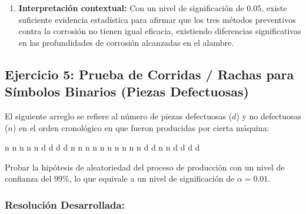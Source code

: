 \documentclass[11pt,a4paper]{article}
\begin{document}
\begin{enumerate}
    \item \textbf{Interpretación contextual:}
    Con un nivel de significación de $0.05$, existe suficiente evidencia estadística para afirmar que los tres métodos preventivos contra la corrosión no tienen igual eficacia, existiendo diferencias significativas en las profundidades de corrosión alcanzadas en el alambre.

\end{enumerate}

\newpage
\subsection{Ejercicio 5: Prueba de Corridas / Rachas para Símbolos Binarios (Piezas Defectuosas)} \label{ej:racha_bin}

\begin{tcolorbox}[colback=white,colframe=blue!60!black,title=Enunciado]
    El siguiente arreglo se refiere al número de piezas defectuosas ($d$) y no defectuosas ($n$) en el orden cronológico en que fueron producidas por cierta máquina:
    \begin{center}
        \ttfamily n n n n n d d d d n n n n n n n n n n d d n n d d d d
    \end{center}
    Probar la hipótesis de aleatoriedad del proceso de producción con un nivel de confianza del $99\%$, lo que equivale a un nivel de significación de $\alpha = 0.01$.
\end{tcolorbox}

\subsubsection*{Resolución Desarrollada:}
\end{document}
